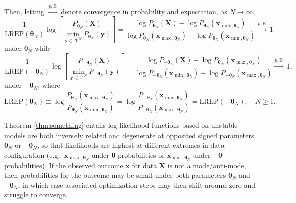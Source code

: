 \documentclass[numbib]{imamat}
\theoremstyle{theorem}
\theoremstyle{lemma}
\theoremstyle{example}
\theoremstyle{corollary}
\theoremstyle{definition}
\theoremstyle{remark}
\theoremstyle{approximation}
\theoremstyle{scheme}
\newcommand{\REP}{\mathrm{LREP}}
\begin{document}
Then, letting \(\stackrel{p, \mathrm{E}}{\longrightarrow}\) denote
convergence in probability and expectation, as \(N\to \infty\), \[
\frac{1}{\REP(\boldsymbol \theta_N)} \log\left[ \frac{P_{\boldsymbol \theta_N }(\boldsymbol X) }{ \displaystyle{\min_{\boldsymbol y\in\mathcal{X}^N}} P_{\boldsymbol \theta_N }(\boldsymbol y)}\right] = \frac{ \log P_{\boldsymbol \theta_N } ( \boldsymbol X)  - \log P_{\boldsymbol \theta_N }(\boldsymbol{x}_{\min, \boldsymbol \theta_N}) }
{ \log P_{\boldsymbol \theta_N } (\boldsymbol{x}_{\max, \boldsymbol \theta_N})  - \log P_{\boldsymbol \theta_N }(\boldsymbol{x}_{\min, \boldsymbol \theta_N}) }
\stackrel{p, \mathrm{E}}{\longrightarrow}
\; 1
\] under \(\boldsymbol\theta_N\) while \[
\frac{1}{\REP(-\boldsymbol \theta_N)} \log\left[ \frac{P_{-\boldsymbol \theta_N }(\boldsymbol X) }{  \displaystyle{\min_{\boldsymbol y\in\mathcal{X}^N}} P_{-\boldsymbol \theta_N }(\boldsymbol y)} \right]
=    \frac{ \log P_{-\boldsymbol \theta_N } ( \boldsymbol X) - \log P_{ \boldsymbol \theta_N }(\boldsymbol{x}_{\max, \boldsymbol \theta_N})    }
{ \log P_{-\boldsymbol \theta_N } (\boldsymbol{x}_{\min, \boldsymbol \theta_N})  - \log P_{-\boldsymbol \theta_N }(\boldsymbol{x}_{\max, \boldsymbol \theta_N}) }
\stackrel{p,\mathrm{E}}{\longrightarrow}
\; 1,
\] under \(-\boldsymbol\theta_N\), where \[
\REP( \boldsymbol \theta_N) \equiv \log \frac{P_{\boldsymbol \theta_N } (\boldsymbol{x}_{\max, \boldsymbol \theta_N})}{P_{\boldsymbol \theta_N }(\boldsymbol{x}_{\min, \boldsymbol \theta_N})} = \log  \frac{P_{-\boldsymbol \theta_N } (\boldsymbol{x}_{\min, \boldsymbol \theta_N}) }{ P_{-\boldsymbol \theta_N }(\boldsymbol{x}_{\max, \boldsymbol \theta_N})}=   \REP( -\boldsymbol \theta_N), \quad N \geq 1.
\]

Theorem \ref{thm:something} entails log-likelihood functions based on
unstable models are both inversely related and degenerate at opposited
signed parameters \(\boldsymbol \theta_N\) or \(-\boldsymbol \theta_N\),
so that likelihoods are highest at different extremes in data
configuration (e.g., \(\boldsymbol{x}_{\max, \boldsymbol \theta_N}\)
under \(\boldsymbol \theta\)-probabilities or
\(\boldsymbol{x}_{\min, \boldsymbol \theta_N}\) under
\(-\boldsymbol \theta\)-probabilities). If the observed outcome
\(\boldsymbol x\) for data \(\boldsymbol X\) is not a mode/anti-mode,
then probabilities for the outcome may be small under both parameters
\(\boldsymbol \theta_N\) and \(-\boldsymbol \theta_N\), in which case
associated optimization steps may then shift around zero and struggle to
converge.
\end{document}
